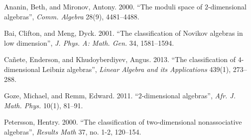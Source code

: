\documentclass{CUP-JNL-PPS}
\begin{document}
\begin{Backmatter}
\begin{thebibliography}{}
{Ananin, Beth, and Mironov, Antony}. 2000. ``The moduli space of $2$-dimensional algebras'', \textit{Comm. Algebra} {28}(9),  {4481}--{4488}.

{Bai, Clifton, and Meng, Dyck}. 2001. ``The classification of Novikov algebras in low dimension'',  \textit{J. Phys. A: Math. Gen.} {34}, {1581}--{1594}.

{Ca\~{n}ete, Enderson, and Khudoyberdiyev, Angus}. 2013. ``The classification of $4$-dimensional Leibniz algebras'',  \textit{Linear Algebra and its Applications}  {439}(1), {273}--{288}.

{Goze, Michael, and Remm, Edward}. 2011.  ``$2$-dimensional algebras'',  \textit{Afr. J. Math. Phys.} {10}(1),  {81}--{91}.

{Petersson, Hentry}. 2000. ``The classification of two-dimensional nonassociative algebras'',  \textit{Results Math} {37}, no. 1-2,  {120}--{154}.

\end{thebibliography}

\end{Backmatter}
\end{document}
